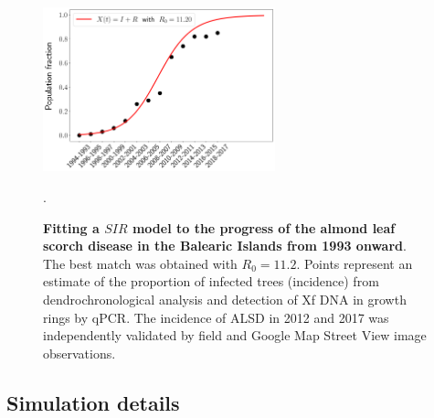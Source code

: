 \begin{figure}[H]
    \centering
    \includegraphics[width=0.6\textwidth]{Figures/R0_xylella.png}
    \caption{\textbf{Fitting a $SIR$ model to the progress of the almond
            leaf scorch disease in the Balearic Islands from 1993 onward}. The
        best match
        was obtained with $R_0= 11.2$. Points represent an estimate of the
        proportion
        of infected trees (incidence) from dendrochronological analysis and
        detection
        of Xf DNA in growth rings by qPCR. The incidence of ALSD in 2012 and
        2017 was
        independently validated by field and Google Map Street View image
        observations.}.
    \label{fig:sup_R0_Europe} %
\end{figure}

\subsection{Simulation details}\label{app:risk_index}

